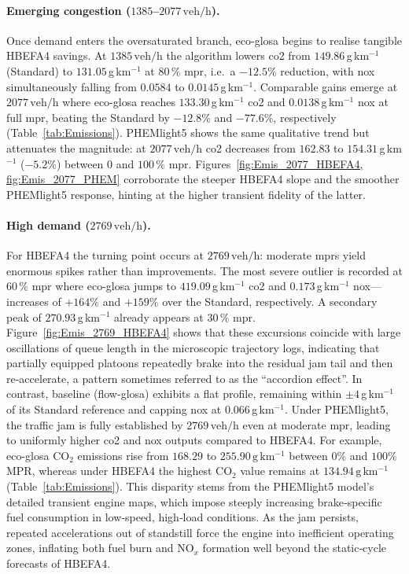 \paragraph{Emerging congestion ($1385$--$2077\,\mathrm{veh/h}$).}
Once demand enters the oversaturated branch, \ac{eco-glosa} begins to realise tangible HBEFA4 savings. At $1385\,\mathrm{veh/h}$ the algorithm lowers \ac{co2} from $149.86$\,g\,km$^{-1}$ (Standard) to $131.05$\,g\,km$^{-1}$ at $80\,\%$ \ac{mpr}, i.e.\ a ${-12.5\%}$ reduction, with \ac{nox} simultaneously falling from $0.0584$ to $0.0145$\,g\,km$^{-1}$. Comparable gains emerge at $2077\,\mathrm{veh/h}$ where \ac{eco-glosa} reaches $133.30$\,g\,km$^{-1}$ \ac{co2} and $0.0138$\,g\,km$^{-1}$ \ac{nox} at full \ac{mpr}, beating the Standard by ${-12.8\%}$ and ${-77.6\%}$, respectively (Table~\ref{tab:Emissions}).  PHEMlight5 shows the same qualitative trend but attenuates the magnitude: at $2077\,\mathrm{veh/h}$ \ac{co2} decreases from $162.83$ to $154.31$\,g\,km$^{-1}$ (${ -5.2\%}$) between $0$ and $100\,\%$ \ac{mpr}.  Figures~\ref{fig:Emis_2077_HBEFA4, fig:Emis_2077_PHEM} corroborate the steeper HBEFA4 slope and the smoother PHEMlight5 response, hinting at the higher transient fidelity of the latter.

\paragraph{High demand ($2769\,\mathrm{veh/h}$).}
For HBEFA4 the turning point occurs at $2769\,\mathrm{veh/h}$: moderate \acp{mpr} yield enormous spikes rather than improvements. The most severe outlier is recorded at $60\,\%$ \ac{mpr} where \ac{eco-glosa} jumps to $419.09$\,g\,km$^{-1}$ \ac{co2} and $0.173$\,g\,km$^{-1}$ \ac{nox}$—$increases of $+164\%$ and $+159\%$ over the Standard, respectively. A secondary peak of $270.93$\,g\,km$^{-1}$ already appears at $30\,\%$ \ac{mpr}. Figure~\ref{fig:Emis_2769_HBEFA4} shows that these excursions coincide with large oscillations of queue length in the microscopic trajectory logs, indicating that partially equipped platoons repeatedly brake into the residual jam tail and then re-accelerate, a pattern sometimes referred to as the \enquote{accordion effect}. In contrast, baseline (\ac{flow-glosa}) exhibits a flat profile, remaining within ${\pm}4$\,g\,km$^{-1}$ of its Standard reference and capping \ac{nox} at $0.066$\,g\,km$^{-1}$.
\mynewline
Under PHEMlight5, the traffic jam is fully established by $2769\,\mathrm{veh/h}$ even at moderate \ac{mpr}, leading to uniformly higher \ac{co2} and \ac{nox} outputs compared to HBEFA4. For example, \ac{eco-glosa} CO$_2$ emissions rise from $168.29$ to $255.90\,\mathrm{g\,km^{-1}}$ between $0\%$ and $100\%$ MPR, whereas under HBEFA4 the highest CO$_2$ value remains at $134.94\,\mathrm{g\,km^{-1}}$ (Table~\ref{tab:Emissions}). This disparity stems from the PHEMlight5 model’s detailed transient engine maps, which impose steeply increasing brake‐specific fuel consumption in low‐speed, high‐load conditions.  As the jam persists, repeated accelerations out of standstill force the engine into inefficient operating zones, inflating both fuel burn and NO$_x$ formation well beyond the static‐cycle forecasts of HBEFA4.

